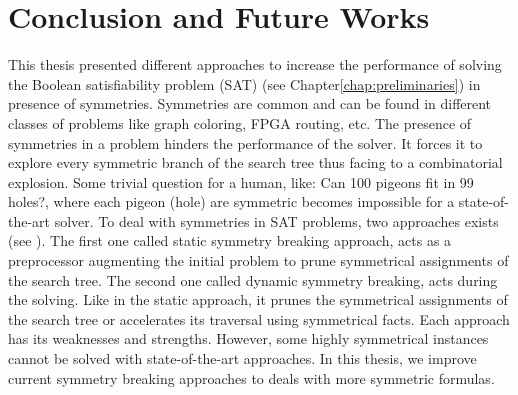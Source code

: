 \chapter{Conclusion and Future Works}\label{chap:conclu}

This thesis presented different approaches to increase the performance of solving 
the Boolean satisfiability problem (SAT) (see Chapter\ref{chap:preliminaries}) in presence of symmetries. 
Symmetries are common and  can be found in different classes of problems like
graph coloring, FPGA routing, etc.
The presence of symmetries in a problem hinders the performance of the solver. It forces
it to explore every symmetric branch of the search tree thus facing to a combinatorial explosion.
Some trivial question for a human, like: Can 100 pigeons fit in 99 holes?,
where each pigeon (hole) are symmetric becomes impossible for a state-of-the-art solver. 
To deal with symmetries in SAT problems, two approaches exists (see ).
The first one called static symmetry breaking approach, acts as a preprocessor augmenting the initial
problem to prune symmetrical assignments of the search tree. The second one called dynamic symmetry breaking,
acts during the solving. Like in the static approach, it prunes the symmetrical assignments of the 
search tree or accelerates its traversal using symmetrical facts.
Each approach has its weaknesses and strengths. However, some highly symmetrical instances cannot be solved with
state-of-the-art approaches. In this thesis, we improve current symmetry breaking approaches to 
deals with more symmetric formulas.

